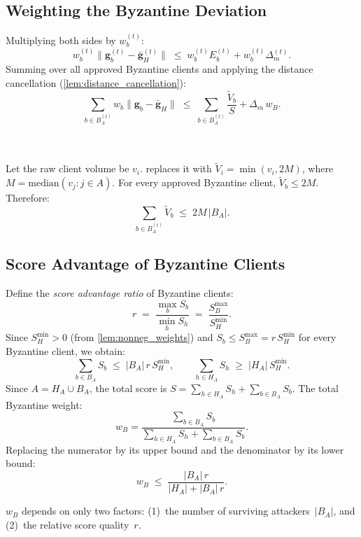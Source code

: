 \documentclass[../main]{subfiles}
\begin{document}
\subsection{Weighting the Byzantine Deviation}

Multiplying both sides by $w_b^{(t)}$:
\[
    w_b^{(t)}\|\mathbf{g}_b^{(t)} - \bar{\mathbf{g}}_H^{(t)}\| \;\leq\; w_b^{(t)} E_b^{(t)} + w_b^{(t)}\Delta_m^{(t)}.
\]
Summing over all approved Byzantine clients and applying the distance cancellation
(\cref{lem:distance_cancellation}):
\begin{equation}
    \sum_{b \in B_A^{(t)}} w_b\|\mathbf{g}_b - \bar{\mathbf{g}}_H\|
    \;\leq\; \sum_{b \in B_A^{(t)}} \frac{\widetilde{V}_b}{S} + \Delta_m\, w_B.
    \label{eq:byz_sum_bound}
\end{equation}
\begin{lemma}
\hfill \\\label{lem:volume_clip}
\hfill \\
Let the raw client volume be $v_i$. \aegis{} replaces it with
$\widetilde{V}_i = \min(v_i, 2M)$, where $M = \mathrm{median}(v_j : j \in A)$.
For every approved Byzantine client, $\widetilde{V}_b \leq 2M$.
Therefore:
\begin{equation}
    \sum_{b \in B_A^{(t)}} \widetilde{V}_b \;\leq\; 2M\,|B_A|.
    \label{eq:volume_clip}
\end{equation}
\end{lemma}

\subsection{Score Advantage of Byzantine Clients}

Define the \emph{score advantage ratio} of Byzantine clients:
\begin{equation}
    r \;=\; \frac{\max_{b} S_b}{\min_{h} S_h} \;=\; \frac{S_B^{\max}}{S_H^{\min}}.
    \label{eq:score_advantage}
\end{equation}
Since $S_H^{\min} > 0$ (from \cref{lem:nonneg_weights}) and
$S_b \leq S_B^{\max} = r\, S_H^{\min}$ for every Byzantine client, we obtain:
\begin{equation}
    \sum_{b \in B_A} S_b \;\leq\; |B_A|\, r\, S_H^{\min},
    \qquad
    \sum_{h \in H_A} S_h \;\geq\; |H_A|\, S_H^{\min}.
    \label{eq:score_bounds}
\end{equation}
Since $A = H_A \cup B_A$, the total score is
$S = \sum_{h \in H_A} S_h + \sum_{b \in B_A} S_b$.
The total Byzantine weight:
\[
    w_B = \frac{\sum_{b \in B_A} S_b}{\sum_{h \in H_A} S_h + \sum_{b \in B_A} S_b}.
\]
Replacing the numerator by its upper bound and the denominator by its lower bound:
\begin{equation}
    \boxed{w_B \;\leq\; \frac{|B_A|\,r}{|H_A| + |B_A|\,r}.}
    \label{eq:wB_bound}
\end{equation}
\begin{remark}
$w_B$ depends on only two factors:
(1)~the number of surviving attackers~$|B_A|$, and
(2)~the relative score quality~$r$.
\end{remark}
\end{document}
